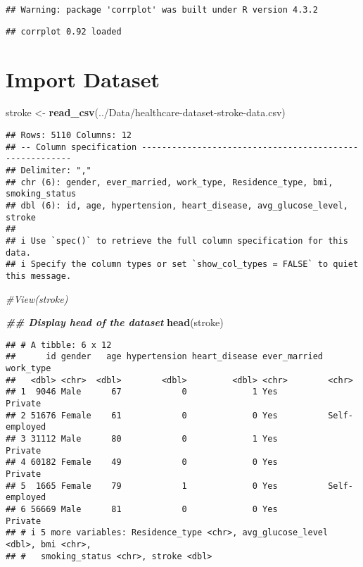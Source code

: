 \documentclass[
]{article}
\newenvironment{Shaded}{\begin{snugshade}}{\end{snugshade}}
\newcommand{\CommentTok}[1]{\textcolor[rgb]{0.56,0.35,0.01}{\textit{#1}}}
\newcommand{\DocumentationTok}[1]{\textcolor[rgb]{0.56,0.35,0.01}{\textbf{\textit{#1}}}}
\newcommand{\FunctionTok}[1]{\textcolor[rgb]{0.13,0.29,0.53}{\textbf{#1}}}
\newcommand{\NormalTok}[1]{#1}
\newcommand{\OtherTok}[1]{\textcolor[rgb]{0.56,0.35,0.01}{#1}}
\newcommand{\StringTok}[1]{\textcolor[rgb]{0.31,0.60,0.02}{#1}}
\begin{document}
\begin{verbatim}
## Warning: package 'corrplot' was built under R version 4.3.2
\end{verbatim}

\begin{verbatim}
## corrplot 0.92 loaded
\end{verbatim}

\hypertarget{import-dataset}{%
\section{Import Dataset}\label{import-dataset}}

\begin{Shaded}
\begin{Highlighting}[]
\NormalTok{stroke }\OtherTok{\textless{}{-}} \FunctionTok{read\_csv}\NormalTok{(}\StringTok{\textquotesingle{}../Data/healthcare{-}dataset{-}stroke{-}data.csv\textquotesingle{}}\NormalTok{)}
\end{Highlighting}
\end{Shaded}

\begin{verbatim}
## Rows: 5110 Columns: 12
## -- Column specification --------------------------------------------------------
## Delimiter: ","
## chr (6): gender, ever_married, work_type, Residence_type, bmi, smoking_status
## dbl (6): id, age, hypertension, heart_disease, avg_glucose_level, stroke
## 
## i Use `spec()` to retrieve the full column specification for this data.
## i Specify the column types or set `show_col_types = FALSE` to quiet this message.
\end{verbatim}

\begin{Shaded}
\begin{Highlighting}[]
\CommentTok{\#View(stroke)}
\end{Highlighting}
\end{Shaded}

\begin{Shaded}
\begin{Highlighting}[]
\DocumentationTok{\#\# Display head of the dataset}
\FunctionTok{head}\NormalTok{(stroke)}
\end{Highlighting}
\end{Shaded}

\begin{verbatim}
## # A tibble: 6 x 12
##      id gender   age hypertension heart_disease ever_married work_type    
##   <dbl> <chr>  <dbl>        <dbl>         <dbl> <chr>        <chr>        
## 1  9046 Male      67            0             1 Yes          Private      
## 2 51676 Female    61            0             0 Yes          Self-employed
## 3 31112 Male      80            0             1 Yes          Private      
## 4 60182 Female    49            0             0 Yes          Private      
## 5  1665 Female    79            1             0 Yes          Self-employed
## 6 56669 Male      81            0             0 Yes          Private      
## # i 5 more variables: Residence_type <chr>, avg_glucose_level <dbl>, bmi <chr>,
## #   smoking_status <chr>, stroke <dbl>
\end{verbatim}
\end{document}
